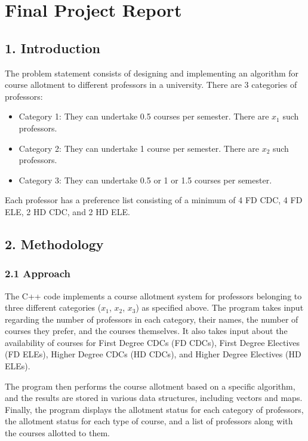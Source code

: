 \documentclass{article}
\begin{document}
\section*{Final Project Report}

\subsection*{1. Introduction}

The problem statement consists of designing and implementing an algorithm for course allotment to different professors in a university. There are 3 categories of professors:

\begin{itemize}
    \item Category 1: They can undertake 0.5 courses per semester. There are $x_1$ such professors.
    \item Category 2: They can undertake 1 course per semester. There are $x_2$ such professors.
    \item Category 3: They can undertake 0.5 or 1 or 1.5 courses per semester.
\end{itemize}

Each professor has a preference list consisting of a minimum of 4 FD CDC, 4 FD ELE, 2 HD CDC, and 2 HD ELE.

\subsection*{2. Methodology}

\subsubsection*{2.1 Approach}

The C++ code implements a course allotment system for professors belonging to three different categories ($x_1$, $x_2$, $x_3$) as specified above. The program takes input regarding the number of professors in each category, their names, the number of courses they prefer, and the courses themselves. It also takes input about the availability of courses for First Degree CDCs (FD CDCs), First Degree Electives (FD ELEs), Higher Degree CDCs (HD CDCs), and Higher Degree Electives (HD ELEs).

The program then performs the course allotment based on a specific algorithm, and the results are stored in various data structures, including vectors and maps. Finally, the program displays the allotment status for each category of professors, the allotment status for each type of course, and a list of professors along with the courses allotted to them.
\end{document}
